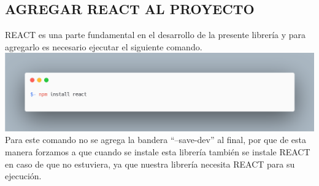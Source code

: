 \subsection{AGREGAR REACT AL PROYECTO}
REACT es una parte fundamental en el desarrollo de la presente librería y para agregarlo es necesario ejecutar el siguiente comando.
\newline
\newline
\includegraphics[width=1\textwidth]{./Imagenes/image23.png}
\newline
Para este comando no se agrega la bandera “–save-dev” al final, por que de esta manera forzamos a que cuando se instale esta librería también se instale REACT en caso de que no estuviera, ya que nuestra librería necesita REACT para su ejecución.


